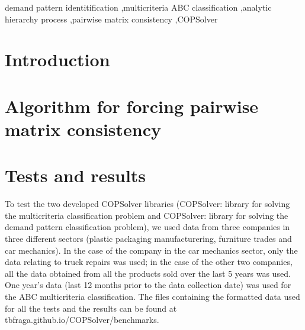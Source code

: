 \documentclass[authoryear,manuscript,12pt]{elsarticle}
\begin{document}
\begin{frontmatter}
\begin{keyword}
demand pattern identitification \sep multicriteria ABC classification \sep analytic hierarchy process \sep pairwise matrix consistency \sep COPSolver
\end{keyword}
\end{frontmatter}


\section{Introduction}
\label{sec:intro}


\section{Algorithm for forcing pairwise matrix consistency}


\section{Tests and results}
\label{sec:results}

To test the two developed COPSolver libraries (COPSolver: library for solving the multicriteria classification problem and COPSolver: library for solving the demand pattern classification problem), we used data from three companies in three different sectors (plastic packaging manufacturering, furniture trades and car mechanics). In the case of the company in the car mechanics sector, only the data relating to truck repairs was used; in the case of the other two companies, all the data obtained from all the products sold over the last 5 years was used. One year's data (last 12 months prior to the data collection date) was used for the ABC multicriteria classification. The files containing the formatted data used for all the tests and the results can be found at tbfraga.github.io/COPSolver/benchmarks. \\
\end{document}
